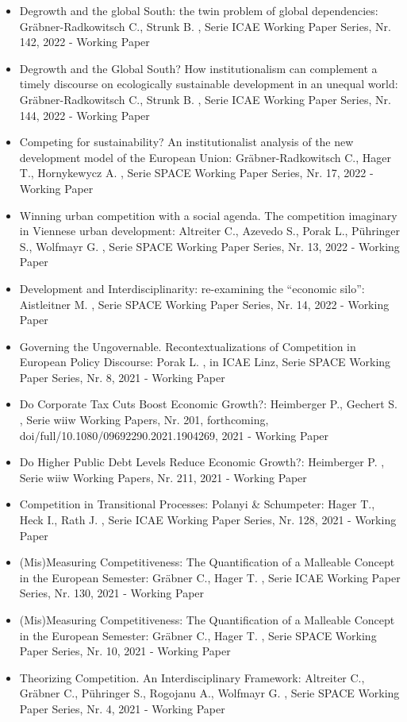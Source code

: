 \begin{itemize}
\item Degrowth and the global South: the twin problem of global dependencies: Gräbner-Radkowitsch C., Strunk B. , Serie ICAE Working Paper Series, Nr. 142, 2022 - Working Paper
\item Degrowth and the Global South? How institutionalism can complement a timely discourse on ecologically sustainable development in an unequal world: Gräbner-Radkowitsch C., Strunk B. , Serie ICAE Working Paper Series, Nr. 144, 2022 - Working Paper
\item Competing for sustainability? An institutionalist analysis of the new development model of the European Union: Gräbner-Radkowitsch C., Hager T., Hornykewycz A. , Serie SPACE Working Paper Series, Nr. 17, 2022 - Working Paper
\item Winning urban competition with a social agenda. The competition imaginary in Viennese urban development: Altreiter C., Azevedo S., Porak L., Pühringer S., Wolfmayr G. , Serie SPACE Working Paper Series, Nr. 13, 2022 - Working Paper
\item Development and Interdisciplinarity: re-examining the “economic silo”: Aistleitner M. , Serie SPACE Working Paper Series, Nr. 14, 2022 - Working Paper
\item Governing the Ungovernable. Recontextualizations of Competition in European Policy Discourse: Porak L. , in ICAE Linz, Serie SPACE Working Paper Series, Nr. 8, 2021 - Working Paper
\item Do Corporate Tax Cuts Boost Economic Growth?: Heimberger P., Gechert S. , Serie wiiw Working Papers, Nr. 201, forthcoming, doi/full/10.1080/09692290.2021.1904269, 2021 - Working Paper
\item Do Higher Public Debt Levels Reduce Economic Growth?: Heimberger P. , Serie wiiw Working Papers, Nr. 211, 2021 - Working Paper
\item Competition in Transitional Processes: Polanyi & Schumpeter: Hager T., Heck I., Rath J. , Serie ICAE Working Paper Series, Nr. 128, 2021 - Working Paper
\item (Mis)Measuring Competitiveness: The Quantification of a Malleable Concept in the European Semester: Gräbner C., Hager T. , Serie ICAE Working Paper Series, Nr. 130, 2021 - Working Paper
\item (Mis)Measuring Competitiveness: The Quantification of a Malleable Concept in the European Semester: Gräbner C., Hager T. , Serie SPACE Working Paper Series, Nr. 10, 2021 - Working Paper
\item Theorizing Competition. An Interdisciplinary Framework: Altreiter C., Gräbner C., Pühringer S., Rogojanu A., Wolfmayr G. , Serie SPACE Working Paper Series, Nr. 4, 2021 - Working Paper

\end{itemize}
